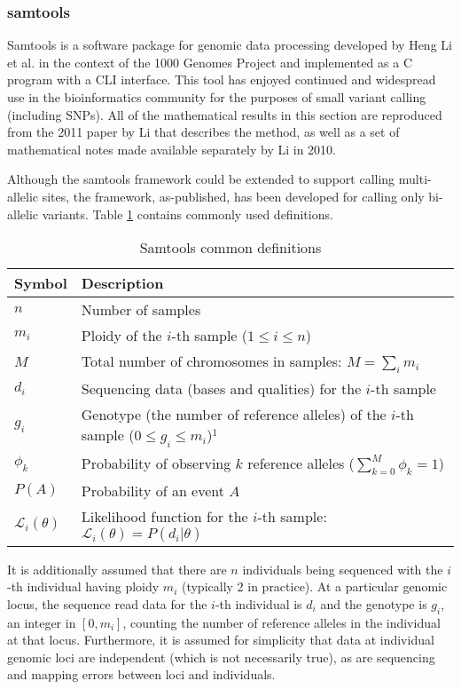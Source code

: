 \subsubsection{samtools}
Samtools\autocite{li2009sequence} is a software package for genomic data processing developed by Heng Li et al. in the context of the 1000 Genomes Project\autocite{10002010map} and implemented as a C program with a CLI interface. This tool has enjoyed continued and widespread use in the bioinformatics community for the purposes of small variant calling (including SNPs). All of the mathematical results in this section are reproduced from the 2011 paper by Li\autocite{li2011statistical} that describes the method, as well as a set of mathematical notes made available separately by Li\autocite{li2010mathematical} in 2010.

\newpage 

Although the samtools framework could be extended to support calling multi-allelic sites, the framework, as-published, has been developed for calling only bi-allelic variants. Table \ref{tab:samtools_notation} contains commonly used definitions.

\begin{table}[!htb]
    \centering
    \caption{Samtools common definitions}
    \label{tab:samtools_notation}
    {\begin{tabular}{lp{7cm}}
    \toprule
    Symbol & Description \\
    \midrule
    $n$ & Number of samples \\
    $m_i$ & Ploidy of the $i$-th sample ($1\le i\le n$)\\
    $M$ & Total number of chromosomes in samples: $M=\sum_i m_i$\\
    $d_i$ & Sequencing data (bases and qualities) for the $i$-th sample\\
    $g_i$ & Genotype (the number of reference alleles) of the $i$-th sample \mbox{($0\le g_i\le m_i$)}$^1$\\
    $\phi_k$ & Probability of observing $k$ reference alleles ($\sum_{k=0}^M\phi_k=1$) \\
    $P(A)$ & Probability of an event $A$\\
    $\mathcal{L}_i(\theta)$ & Likelihood function for the $i$-th sample: $\mathcal{L}_i(\theta)=P(d_i|\theta)$ \\
    \bottomrule
    \end{tabular}}
\end{table}

It is additionally assumed that there are $n$ individuals being sequenced with the $i$-th individual having ploidy $m_i$ (typically 2 in practice). At a particular genomic locus, the sequence read data for the $i$-th individual is $d_i$ and the genotype is $g_i$, an integer in $[0,m_i]$, counting the number of reference alleles in the individual at that locus. Furthermore, it is assumed for simplicity that data at individual genomic loci are independent (which is not necessarily true), as are sequencing and mapping errors between loci and individuals.

